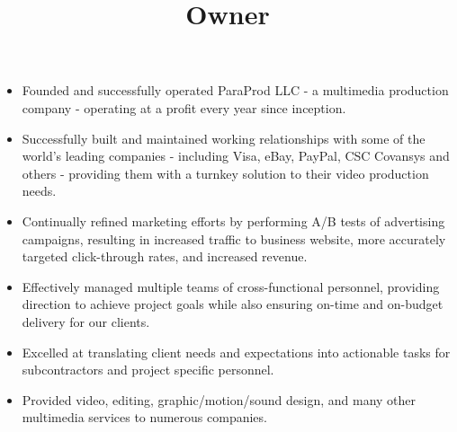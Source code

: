 \begin{resume}
\title{Owner}
\begin{position}
\begin{itemize}
	\item Founded and successfully operated ParaProd LLC - a multimedia production company - operating at a profit every year since inception.
	\item Successfully built and maintained working relationships with some of the world's leading companies - including Visa, eBay, PayPal, CSC Covansys and others - providing them with a turnkey solution to their video production needs.
	\item Continually refined marketing efforts by performing A/B tests of advertising campaigns, resulting in increased traffic to business website, more accurately targeted click-through rates, and increased revenue.
	\item Effectively managed multiple teams of cross-functional personnel, providing direction to achieve project goals while also ensuring on-time and on-budget delivery for our clients.
	\item Excelled at translating client needs and expectations into actionable tasks for subcontractors and project specific personnel.
	\item Provided video, editing, graphic/motion/sound design, and many other multimedia services to numerous companies.
\end{itemize}
\end{position}





\end{resume}
